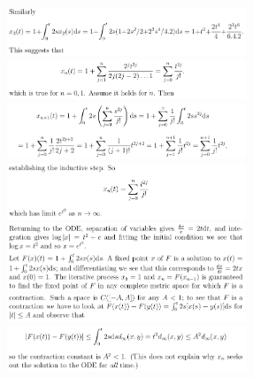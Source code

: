 \documentclass[8pt,landscape]{article}
\begin{document}
\begin{multicols}{3}
    \includegraphics[width=270]{119.png} \\
    \includegraphics[width=270]{120.png} \\
    \includegraphics[width=270]{121.png} \\
    \includegraphics[width=270]{122.png} \\
    \includegraphics[width=270]{123.png} \\
    \includegraphics[width=270]{124.png} \\
    \includegraphics[width=270]{125.png} \\

\end{multicols}
\end{document}
